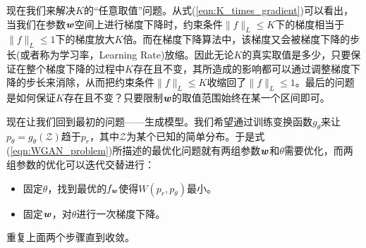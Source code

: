 现在我们来解决$K$的“任意取值”问题。从式(\ref{eqn:K_times_gradient})可以看出，当我们在参数$\boldsymbol{\mathit{w}}$空间上进行梯度下降时，约束条件$\|f\|_{L}\leq K$下的梯度相当于$\|f\|_{L}\leq1$下的梯度放大$K$倍。而在梯度下降算法中，该梯度又会被梯度下降的步长(或者称为学习率，Learning Rate)放缩。因此无论$K$的真实取值是多少，只要保证在整个梯度下降的过程中$K$存在且不变，其所造成的影响都可以通过调整梯度下降的步长来消除，从而把约束条件$\|f\|_{L}\leq K$收缩回了$\|f\|_{L}\leq1$。最后的问题是如何保证$K$存在且不变？只要限制$\boldsymbol{\mathit{w}}$的取值范围始终在某一个区间即可。

现在让我们回到最初的问题——生成模型。我们希望通过训练变换函数$g_{\theta}$来让$p_{\theta}=g_{\theta}(\mathcal{Z})$趋于$p_{r}$，其中$\mathcal{Z}$为某个已知的简单分布。于是式(\ref{eqn:WGAN_problem})所描述的最优化问题就有两组参数$\boldsymbol{\mathit{w}}$和$\theta$需要优化，而两组参数的优化可以迭代交替进行：
\begin{itemize}
	\setlength{\itemsep}{0pt}
    \setlength{\parsep}{0pt}
    \setlength{\parskip}{0pt}
    \item 固定$\theta$，找到最优的$f_{\boldsymbol{\mathit{w}}}$使得$W(p_{r},p_{\theta})$最小。
    \item 固定$\boldsymbol{\mathit{w}}$，对$\theta$进行一次梯度下降。
\end{itemize}
重复上面两个步骤直到收敛。


